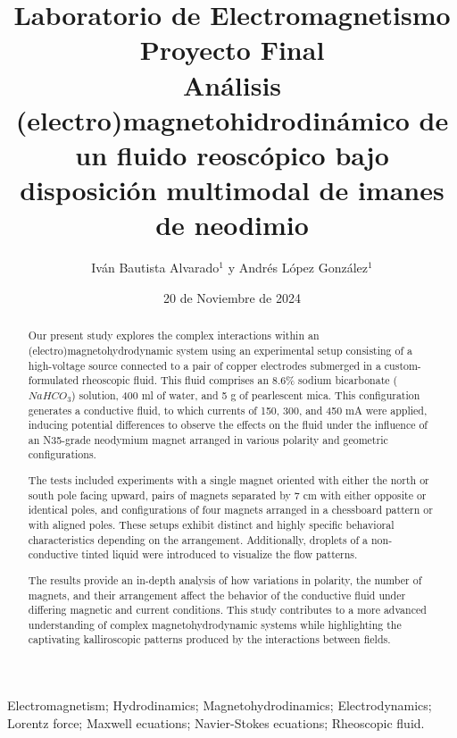 \documentclass[article,12pt]{elsarticle}
\date{20 de Noviembre de 2024}
\begin{document}
\begin{frontmatter}
    \title{Laboratorio de Electromagnetismo \\  Proyecto  Final\\ 
        Análisis (electro)magnetohidrodinámico de un fluido reoscópico bajo disposición multimodal de imanes de neodimio }
    \author{Iván Bautista Alvarado$^1$ y Andrés López González$^1$} %
    \address{$^1$ Facultad de Ciencias, Universidad Nacional Autónoma de México, M\'exico CDMX.}


    \begin{abstract}
     Our present study explores the complex interactions within an (electro)magnetohydrodynamic system using an experimental setup consisting of a high-voltage source connected to a pair of copper electrodes submerged in a custom-formulated rheoscopic fluid. This fluid comprises an 8.6\% sodium bicarbonate ($NaHCO_3$) solution, 400 ml of water, and 5 g of pearlescent mica. This configuration generates a conductive fluid, to which currents of 150, 300, and 450 mA were applied, inducing potential differences to observe the effects on the fluid under the influence of an N35-grade neodymium magnet arranged in various polarity and geometric configurations. 

The tests included experiments with a single magnet oriented with either the north or south pole facing upward, pairs of magnets separated by 7 cm with either opposite or identical poles, and configurations of four magnets arranged in a chessboard pattern or with aligned poles. These setups exhibit distinct and highly specific behavioral characteristics depending on the arrangement. Additionally, droplets of a non-conductive tinted liquid were introduced to visualize the flow patterns. 

The results provide an in-depth analysis of how variations in polarity, the number of magnets, and their arrangement affect the behavior of the conductive fluid under differing magnetic and current conditions. This study contributes to a more advanced understanding of complex magnetohydrodynamic systems while highlighting the captivating kalliroscopic patterns produced by the interactions between fields.
    \end{abstract}

    \begin{keyword}
     Electromagnetism; Hydrodinamics; Magnetohydrodinamics; Electrodynamics; Lorentz force; Maxwell ecuations; Navier-Stokes ecuations; Rheoscopic fluid.
    \end{keyword}
\end{frontmatter}
\end{document}
